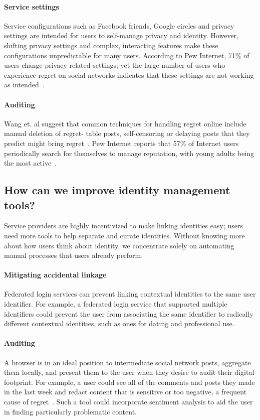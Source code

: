 \documentclass[10pt, conference, compsocconf]{IEEEtran}
\begin{document}
\paragraph{Service settings} Service configurations such as Facebook friends,
Google circles and privacy settings are intended for users to self-manage
privacy and identity. However, shifting privacy settings and complex,
interacting features make these configurations unpredictable for many users.
According to Pew Internet, 71\% of users change privacy-related settings; yet
the large number of users who experience regret on social networks indicates
that these settings are not working as intended~\cite{pew3}.

\paragraph{Auditing} Wang et. al suggest that common techniques
for handling regret online include manual deletion of regret- table posts,
self-censoring or delaying posts that they predict might bring
regret~\cite{wang}. Pew Internet reports that 57\% of Internet users
periodically search for themselves to manage reputation, with young adults
being the most active~\cite{pew3}.

\subsection{How can we improve identity management tools?}

Service providers are highly incentivized to make linking identities easy;
users need more tools to help separate and curate identities. Without
knowing more about how users think about identity, we concentrate solely on
automating manual processes that users already perform.

\paragraph{Mitigating accidental linkage} Federated login services can prevent
linking contextual identities to the same user identifier. For example, a
federated login service that supported multiple identifiers could prevent the
user from associating the same identifier to radically different
contextual identities, such as ones for dating and professional use.

\paragraph{Auditing}
A browser is in an ideal position to intermediate social network
posts, aggregate them locally, and present them to the user when they desire to
audit their digital footprint.  For example, a user could see all of the
comments and posts they made in the last week and redact content that is
sensitive or too negative, a frequent cause of regret~\cite{wang}. 
Such a tool could incorporate sentiment analysis to aid the user in finding
particularly problematic content.
\end{document}
